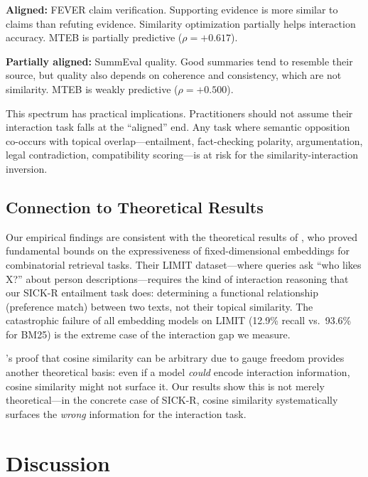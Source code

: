 \documentclass{article}
\begin{document}
\textbf{Aligned:} FEVER claim verification. Supporting evidence is more similar to claims than refuting evidence. Similarity optimization partially helps interaction accuracy. MTEB is partially predictive ($\rho = +0.617$).

\textbf{Partially aligned:} SummEval quality. Good summaries tend to resemble their source, but quality also depends on coherence and consistency, which are not similarity. MTEB is weakly predictive ($\rho = +0.500$).

This spectrum has practical implications. Practitioners should not assume their interaction task falls at the ``aligned'' end. Any task where semantic opposition co-occurs with topical overlap---entailment, fact-checking polarity, argumentation, legal contradiction, compatibility scoring---is at risk for the similarity-interaction inversion.

\subsection{Connection to Theoretical Results}

Our empirical findings are consistent with the theoretical results of \citet{weller2025limit}, who proved fundamental bounds on the expressiveness of fixed-dimensional embeddings for combinatorial retrieval tasks. Their LIMIT dataset---where queries ask ``who likes X?'' about person descriptions---requires the kind of interaction reasoning that our SICK-R entailment task does: determining a functional relationship (preference match) between two texts, not their topical similarity. The catastrophic failure of all embedding models on LIMIT (12.9\% recall vs.\ 93.6\% for BM25) is the extreme case of the interaction gap we measure.

\citet{steck2024cosine}'s proof that cosine similarity can be arbitrary due to gauge freedom provides another theoretical basis: even if a model \emph{could} encode interaction information, cosine similarity might not surface it. Our results show this is not merely theoretical---in the concrete case of SICK-R, cosine similarity systematically surfaces the \emph{wrong} information for the interaction task.

\section{Discussion}
\label{sec:discussion}
\end{document}
